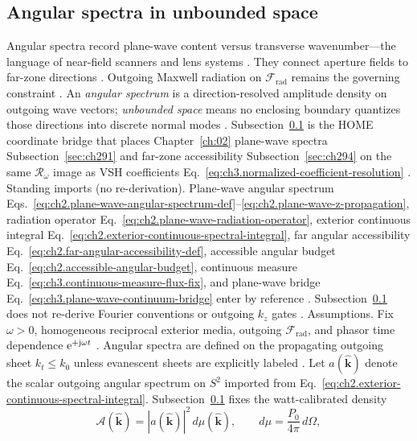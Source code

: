 \subsection{Angular spectra in unbounded space}
\label{sec:ch371}
Angular spectra record plane-wave content versus transverse wavenumber---the language of near-field scanners and lens systems \cite{stratton1941}. They connect aperture fields to far-zone directions \cite{harrington2001}. Outgoing Maxwell radiation on $\mathcal{F}_{\mathrm{rad}}$ remains the governing constraint \cite{stratton1941}.
An \emph{angular spectrum} is a direction-resolved amplitude density on outgoing wave vectors; \emph{unbounded
space} means no enclosing boundary quantizes those directions into discrete normal modes
\cite{jackson1999}. Subsection~\ref{sec:ch371} is the HOME coordinate bridge that places
Chapter~\ref{ch:02} plane-wave spectra Subsection~\ref{sec:ch291} and far-zone accessibility Subsection~\ref{sec:ch294}
on the same \(\mathcal{R}_\omega\) image as VSH coefficients Eq.~\eqref{eq:ch3.normalized-coefficient-resolution}
\cite{hansen1988}.
Standing imports (no re-derivation). Plane-wave angular spectrum Eqs.~\eqref{eq:ch2.plane-wave-angular-spectrum-def}--\eqref{eq:ch2.plane-wave-z-propagation},
radiation operator Eq.~\eqref{eq:ch2.plane-wave-radiation-operator}, exterior continuous integral
Eq.~\eqref{eq:ch2.exterior-continuous-spectral-integral}, far angular accessibility
Eq.~\eqref{eq:ch2.far-angular-accessibility-def}, accessible angular budget
Eq.~\eqref{eq:ch2.accessible-angular-budget}, continuous measure
Eq.~\eqref{eq:ch3.continuous-measure-flux-fix}, and plane-wave bridge
Eq.~\eqref{eq:ch3.plane-wave-continuum-bridge} enter by reference \cite{stratton1941}.
Subsection~\ref{sec:ch371} does not re-derive Fourier conventions or outgoing \(k_{z}\) gates
\cite{stratton1941}.
Assumptions. Fix \(\omega>0\), homogeneous reciprocal exterior media, outgoing \(\mathcal{F}_{\mathrm{rad}}\), and phasor time
dependence $\mathrm{e}^{+\mathrm{j}\omega t}$ \cite{stratton1941}. Angular spectra are defined on the propagating
outgoing sheet \(k_{t}\le k_{0}\) unless evanescent sheets are explicitly labeled
\cite{stratton1941}.
Let \(a(\widehat{\mathbf{k}})\) denote the scalar outgoing angular spectrum on \(S^{2}\) imported from
Eq.~\eqref{eq:ch2.exterior-continuous-spectral-integral}. Subsection~\ref{sec:ch371} fixes the watt-calibrated density
\begin{equation}
\label{eq:ch3.unbounded-angular-spectrum-def}
\mathcal{A}(\widehat{\mathbf{k}})
=
|a(\widehat{\mathbf{k}})|^{2}\,d\mu(\widehat{\mathbf{k}}),
\qquad
d\mu=\frac{P_{0}}{4\pi}\,d\Omega,
\end{equation}
